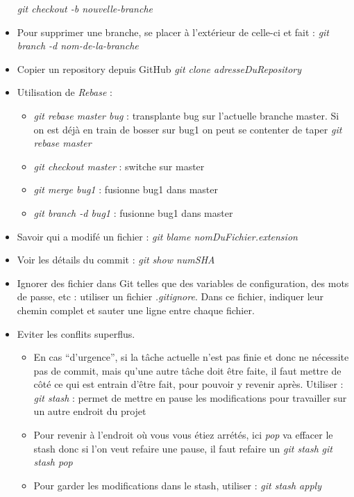 \documentclass[12pt,a4paper]{article}
\begin{document}
\begin{itemize}
\newline \textit{git checkout -b nouvelle-branche}
\item Pour supprimer une branche, se placer à l'extérieur de celle-ci et fait :
\textit{git branch -d nom-de-la-branche}
\item Copier un repository depuis GitHub
\newline \textit{git clone adresseDuRepository}
\item Utilisation de \textit{Rebase} :
\begin{itemize}
\item \textit{git rebase master bug} : transplante bug sur l'actuelle branche master. Si on est déjà en train de bosser sur bug1 on peut se contenter de taper \textit{git rebase master}
\item \textit{git checkout master} : switche sur master
\item \textit{git merge bug1} : fusionne bug1 dans master
\item \textit{git branch -d bug1} : fusionne bug1 dans master
\end{itemize}
\item Savoir qui a modifé un fichier :
\newline \textit{git blame nomDuFichier.extension}
\item Voir les détails du commit :
\newline \textit{git show numSHA}
\item Ignorer des fichier dans Git telles que des variables de configuration, des mots de passe, etc : 
\newline utiliser un fichier \textit{.gitignore}. Dans ce fichier, indiquer leur chemin complet et sauter une ligne entre chaque fichier.
\item Eviter les conflits superflus. 
\begin{itemize} 
\item En cas “d’urgence”, si la tâche actuelle n’est pas finie et donc ne nécessite pas de commit, mais qu’une autre tâche doit être faite, il faut mettre de côté ce qui est entrain d’être fait, pour pouvoir y revenir après. Utiliser :
\newline \textit{git stash} : permet de mettre en pause les modifications pour travailler sur un autre endroit du projet
\item Pour revenir à l'endroit où vous vous étiez arrétés, ici \textit{pop} va effacer le stash donc si l'on veut refaire une pause, il faut refaire un \textit{git stash}
\newline \textit{git stash pop}
\item Pour garder les modifications dans le stash, utiliser :
\newline \textit{git stash apply}
\end{itemize}
\end{itemize}
\end{document}
